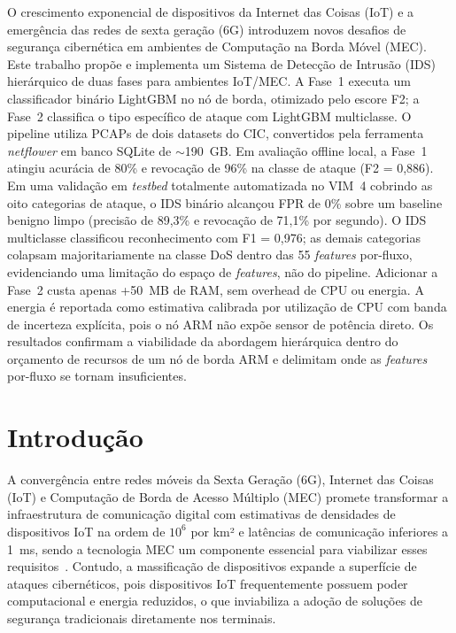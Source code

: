 \documentclass[12pt]{article}
\begin{document}
\begin{resumo}
O crescimento exponencial de dispositivos da Internet das Coisas (IoT) e a
emergência das redes de sexta geração (6G) introduzem novos desafios de
segurança cibernética em ambientes de Computação na Borda Móvel (MEC).
Este trabalho propõe e implementa um Sistema de Detecção de Intrusão (IDS)
hierárquico de duas fases para ambientes IoT/MEC. A Fase~1 executa um
classificador binário LightGBM no nó de borda, otimizado pelo escore F2; a
Fase~2 classifica o tipo específico de ataque com LightGBM multiclasse. O pipeline utiliza PCAPs de
dois datasets do CIC, convertidos pela ferramenta \textit{netflower} em banco
SQLite de $\sim$190~GB. Em avaliação offline local, a Fase~1 atingiu acurácia de
80\% e revocação de 96\% na classe de ataque (F2 = 0,886). Em uma validação em
\textit{testbed} totalmente automatizada no VIM~4 cobrindo as oito categorias de ataque, o
IDS binário alcançou FPR de 0\% sobre um baseline benigno limpo (precisão de
89,3\% e revocação de 71,1\% por segundo). O IDS multiclasse classificou
reconhecimento com F1 = 0,976; as demais categorias colapsam majoritariamente na
classe DoS dentro das 55 \textit{features} por-fluxo, evidenciando uma limitação
do espaço de \textit{features}, não do pipeline. Adicionar a Fase~2 custa apenas
+50~MB de RAM, sem overhead de CPU ou energia. A energia é reportada como
estimativa calibrada por utilização de CPU com banda de incerteza explícita,
pois o nó ARM não expõe sensor de potência direto. Os resultados confirmam a
viabilidade da abordagem hierárquica dentro do orçamento de recursos de um nó de
borda ARM e delimitam onde as \textit{features} por-fluxo se tornam
insuficientes.
\end{resumo}

\section{Introdução}

A convergência entre redes móveis da Sexta Geração (6G), Internet das Coisas (IoT) e Computação de Borda de Acesso Múltiplo (MEC) promete transformar a infraestrutura
de comunicação digital com estimativas de densidades de dispositivos IoT na
ordem de $10^6$ por km² e latências de comunicação inferiores a 1~ms, sendo a tecnologia MEC um componente essencial para viabilizar esses requisitos~\cite{you:21}. Contudo,
a massificação de dispositivos expande a superfície de ataques cibernéticos, pois dispositivos IoT frequentemente possuem poder computacional e energia reduzidos, o que inviabiliza a adoção de soluções de segurança tradicionais diretamente nos terminais.
\end{document}
